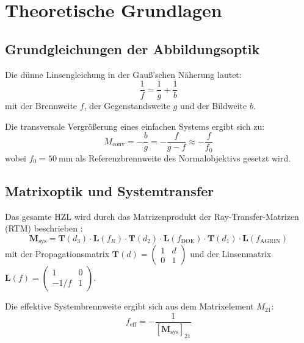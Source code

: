 ﻿\documentclass[12pt,a4paper]{article}
\theoremstyle{definition}
\newcommand{\conv}{\mathrm{conv}}
\newcommand{\eff}{\mathrm{eff}}
\newcommand{\AGRIN}{\mathrm{AGRIN}}
\newcommand{\DOE}{\mathrm{DOE}}
\begin{document}
	\section{Theoretische Grundlagen}
	
	\subsection{Grundgleichungen der Abbildungsoptik}
	
	Die dünne Linsengleichung in der Gauß'schen Näherung lautet:
	\begin{equation}
		\frac{1}{f} = \frac{1}{g} + \frac{1}{b}
		\label{eq:thin_lens}
	\end{equation}
	mit der Brennweite $f$, der Gegenstandsweite $g$ und der Bildweite $b$.
	
	Die transversale Vergrößerung eines einfachen Systems ergibt sich zu:
	\begin{equation}
		M_\conv = -\frac{b}{g} = -\frac{f}{g - f}
		\approx -\frac{f}{f_0}
		\label{eq:mag_conv}
	\end{equation}
	wobei $f_0 = \SI{50}{\milli\metre}$ als Referenzbrennweite des Normalob\-jektivs
	gesetzt wird.
	
	\subsection{Matrixoptik und Systemtransfer}
	
	Das gesamte HZL wird durch das Matrizenprodukt der Ray-Transfer-Matrizen
	(RTM) beschrieben \cite{saleh2007fundamentals}:
	\begin{equation}
		\mathbf{M}_\mathrm{sys} =
		\mathbf{T}(d_3)\cdot\mathbf{L}(f_R)\cdot\mathbf{T}(d_2)\cdot
		\mathbf{L}(f_\DOE)\cdot\mathbf{T}(d_1)\cdot\mathbf{L}(f_\AGRIN)
		\label{eq:rtm}
	\end{equation}
	mit der Propagationsmatrix
	\(
	\mathbf{T}(d) = \begin{pmatrix}1 & d \\ 0 & 1\end{pmatrix}
	\)
	und der Linsenmatrix
	\(
	\mathbf{L}(f) = \begin{pmatrix}1 & 0 \\ -1/f & 1\end{pmatrix}.
	\)
	
	Die effektive Systembrennweite ergibt sich aus dem Matrixelement $M_{21}$:
	\begin{equation}
		f_\eff = -\frac{1}{[\mathbf{M}_\mathrm{sys}]_{21}}
		\label{eq:f_eff}
	\end{equation}
	
\end{document}
